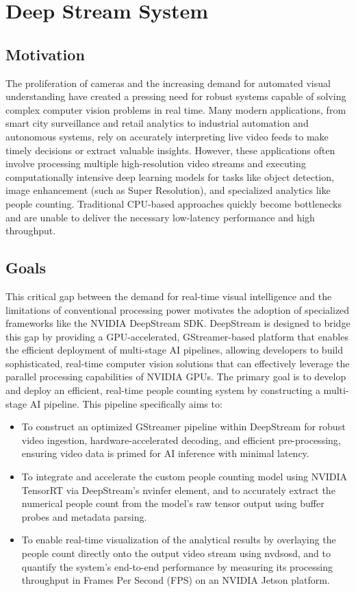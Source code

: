 \section{Deep Stream System}
\subsection{Motivation}
The proliferation of cameras and the increasing demand for automated visual understanding have created a pressing need for robust systems capable of solving complex computer vision problems in real time. Many modern applications, from smart city surveillance and retail analytics to industrial automation and autonomous systems, rely on accurately interpreting live video feeds to make timely decisions or extract valuable insights. However, these applications often involve processing multiple high-resolution video streams and executing computationally intensive deep learning models for tasks like object detection, image enhancement (such as Super Resolution), and specialized analytics like people counting. Traditional CPU-based approaches quickly become bottlenecks and are unable to deliver the necessary low-latency performance and high throughput.
\subsection{Goals}
This critical gap between the demand for real-time visual intelligence and the limitations of conventional processing power motivates the adoption of specialized frameworks like the NVIDIA DeepStream SDK. DeepStream is designed to bridge this gap by providing a GPU-accelerated, GStreamer-based platform that enables the efficient deployment of multi-stage AI pipelines, allowing developers to build sophisticated, real-time computer vision solutions that can effectively leverage the parallel processing capabilities of NVIDIA GPUs.
The primary goal is to develop and deploy an efficient, real-time people counting system by constructing a multi-stage AI pipeline. This pipeline specifically aims to:
\begin{itemize}
    \item To construct an optimized GStreamer pipeline within DeepStream for robust video ingestion, hardware-accelerated decoding, and efficient pre-processing, ensuring video data is primed for AI inference with minimal latency.
    \item To integrate and accelerate the custom people counting model using NVIDIA TensorRT via DeepStream's nvinfer element, and to accurately extract the numerical people count from the model's raw tensor output using buffer probes and metadata parsing.
    \item To enable real-time visualization of the analytical results by overlaying the people count directly onto the output video stream using nvdsosd, and to quantify the system's end-to-end performance by measuring its processing throughput in Frames Per Second (FPS) on an NVIDIA Jetson platform.
\end{itemize}
